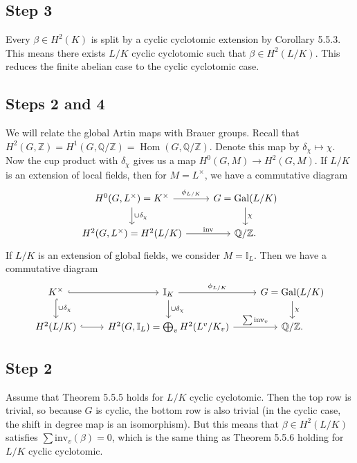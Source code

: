 \documentclass[leqno, openany]{memoir}
\theoremstyle{definition}
\theoremstyle{remark}
\theoremstyle{plain}
\theoremstyle{definition}
\theoremstyle{remark}
\newcommand{\Z}{\mathbb{Z}}
\newcommand{\Q}{\mathbb{Q}}
\newcommand{\I}{\mathbb{I}}
\newcommand{\mr}[1]{\mathrm{#1}}
\DeclareMathOperator{\Hom}{Hom}
\DeclareMathOperator{\Gal}{Gal}
\begin{document}
\subsection{Step 3}%
\label{sub:step_3}

Every $\beta \in H^2(K)$ is split by a cyclic cyclotomic extension by Corollary 5.5.3. This means there exists $L/K$ cyclic cyclotomic such that $\beta \in H^2(L/K)$. This reduces the finite abelian case to the cyclic cyclotomic case.

\subsection{Steps 2 and 4}%
\label{sub:steps_2_and_4}

We will relate the global Artin maps with Brauer groups. Recall that $H^2(G, \Z) = H^1(G, \Q/\Z) = \Hom(G, \Q/\Z)$. Denote this map by $\delta_{\chi} \mapsto \chi$. Now the cup product with $\delta_{\chi}$ gives us a map $H^0(G, M) \to H^2(G, M)$. If $L/K$ is an extension of local fields, then for $M = L^{\times}$, we have a commutative diagram
\begin{equation*}
\begin{tikzcd}
    H^0(G, L^{\times}) = K^{\times} \ar{r}{\phi_{L/K}} \ar{d}{\cup \delta_{\chi}} & G = \Gal(L/K) \ar{d}{\chi} \\
    H^2(G, L^{\times}) = H^2(L/K) \ar{r}{\mr{inv}} & \Q/\Z.
\end{tikzcd}
\end{equation*}
If $L/K$ is an extension of global fields, we consider $M = \I_L$. Then we have a commutative diagram
\begin{equation}
\begin{tikzcd}
    K^{\times} \ar[hookrightarrow]{d}{\cup \delta_{\chi}} \ar[hookrightarrow]{r} & \I_K \ar{r}{\phi_{L/K}} \ar{d}{\cup \delta_{\chi}} & G = \Gal(L/K) \ar{d}{\chi} \\
    H^2(L/K) \ar[hookrightarrow]{r} & H^2(G, \I_L) = \bigoplus_v H^2(L^v/K_v) \ar{r}{\sum \mr{inv}_v} & \Q/\Z.
\end{tikzcd}
\end{equation}

\subsection{Step 2}%
\label{sub:step_2}

Assume that Theorem 5.5.5 holds for $L/K$ cyclic cyclotomic. Then the top row is trivial, so because $G$ is cyclic, the bottom row is also trivial (in the cyclic case, the shift in degree map is an isomorphism). But this means that $\beta \in H^2(L/K)$ satisfies $\sum \mr{inv}_v(\beta) = 0$, which is the same thing as Theorem 5.5.6 holding for $L/K$ cyclic cyclotomic.
\end{document}
